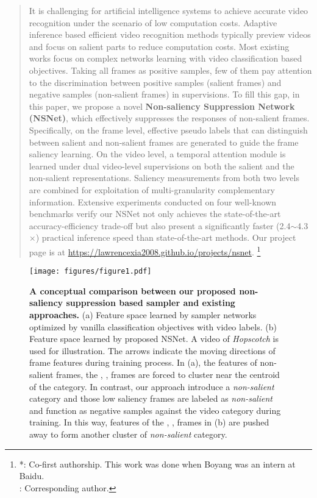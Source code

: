 \documentclass[runningheads]{llncs}
\newcommand\blfootnote[1]{\begingroup
  \renewcommand\thefootnote{}\footnote{#1}\addtocounter{footnote}{-1}\endgroup
}
\begin{document}
\begin{abstract}
It is challenging for artificial intelligence systems to achieve accurate video recognition under the scenario of low computation costs. Adaptive inference based efficient video recognition methods typically preview videos and focus on salient parts to reduce computation costs. 
Most existing works focus on complex networks learning with video classification based objectives. 
Taking all frames as positive samples, few of them pay attention to the discrimination between positive samples (salient frames) and negative samples (non-salient frames) in supervisions. To fill this gap, in this paper, we propose a novel \textbf{Non-saliency Suppression Network (NSNet)}, which 
effectively suppresses the responses of non-salient frames. 
Specifically, on the frame level, effective pseudo labels that can distinguish between salient and non-salient frames are generated to guide the frame saliency learning.
On the video level, a temporal attention module is learned under dual video-level supervisions on both the salient and the non-salient representations. Saliency measurements from both two levels are combined for exploitation of multi-granularity complementary information. Extensive experiments conducted on four well-known benchmarks
verify our NSNet not only achieves the state-of-the-art accuracy-efficiency trade-off but also present a significantly faster (2.4$\sim$4.3$\times$) practical inference speed than state-of-the-art methods. Our project page is at \url{https://lawrencexia2008.github.io/projects/nsnet}.
\blfootnote{*: Co-first authorship. This work was done when Boyang was an intern at Baidu. \\ \Letter: Corresponding author.}
\end{abstract}



\begin{figure}[t]
      \centering \texttt{[image: figures/figure1.pdf]}
      \caption{\textbf{A conceptual comparison between our proposed non-saliency suppression based sampler and existing approaches. } (a) Feature space learned by sampler networks 
optimized by vanilla classification objectives with video labels. (b) Feature space learned by proposed NSNet.
       A video of \emph{Hopscotch} is used for illustration. The arrows indicate the moving directions of frame features during training process. In (a),
the features of non-salient frames, the , ,  frames are forced to cluster near the centroid of the category. 
In contrast, our approach introduce a \emph{non-salient} category and those low saliency frames are labeled as \emph{non-salient} and function as negative samples against the video category during training. In this way, features of the , ,  frames in (b) are pushed away to form another cluster of \emph{non-salient} category.
}
      \label{fig:figure1}
\end{figure}
\end{document}
